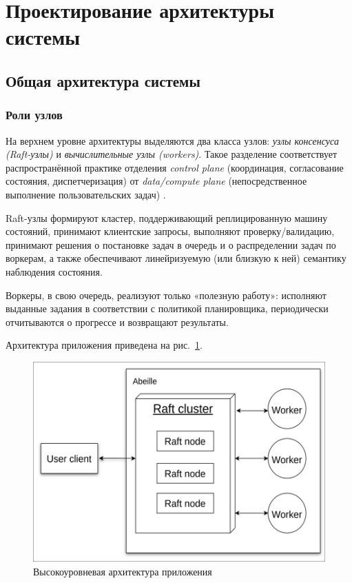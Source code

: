 \section{Проектирование архитектуры системы}

\subsection{Общая архитектура системы}

\subsubsection{Роли узлов}

На верхнем уровне архитектуры выделяются два класса узлов: \emph{узлы
консенсуса (Raft-узлы)} и \emph{вычислительные узлы (workers)}. Такое
разделение соответствует распространённой практике отделения \emph{control
plane} (координация, согласование состояния, диспетчеризация) от
\emph{data/compute plane} (непосредственное выполнение пользовательских задач)
\cite{coulouris2012}.

Raft-узлы формируют кластер, поддерживающий реплицированную машину состояний,
принимают клиентские запросы, выполняют проверку/валидацию, принимают решения о
постановке задач в очередь и о распределении задач по воркерам, а также
обеспечивают линейризуемую (или близкую к ней) семантику наблюдения состояния.

Воркеры, в свою очередь, реализуют только «полезную работу»: исполняют выданные
задания в соответствии с политикой планировщика, периодически отчитываются о
прогрессе и возвращают результаты.

Архитектура приложения приведена на рис.~\ref{fig:arch-overview}.

\begin{figure}
  \centering
  \includegraphics[scale=0.4]{inc/arch-overview.png}
  \caption{Высокоуровневая архитектура приложения}
  \label{fig:arch-overview}
\end{figure}

